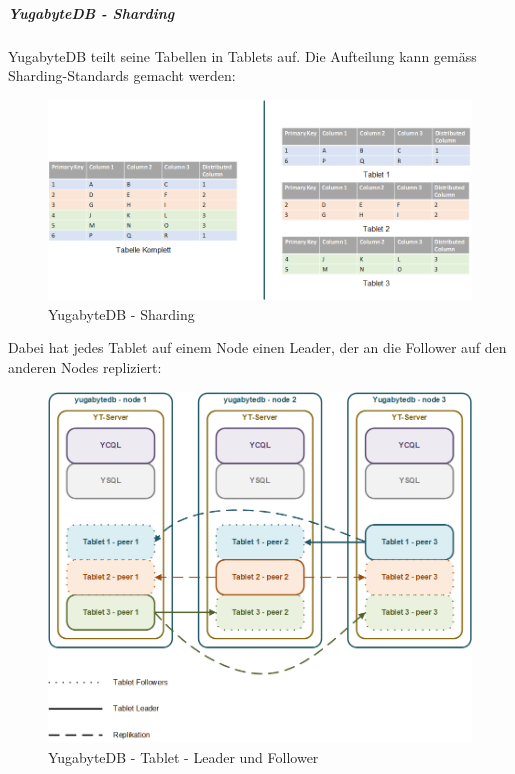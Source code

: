 \clearpage
\begin{flushleft}
    \subparagraph{YugabyteDB - Sharding}
    YugabyteDB teilt seine Tabellen in Tablets auf.
    Die Aufteilung kann gemäss Sharding-Standards gemacht werden:
    \begin{figure}[H]
        \centering
        \includegraphics[width=0.8\linewidth]{source/implementation/evaluation/postgresql_ha_solutions/yugabytedb/yugabytedb-sharding-tablets}
        \caption{YugabyteDB - Sharding}
        \label{fig:yugabytedb-sharding-tablets}
    \end{figure}
\end{flushleft}
\begin{flushleft}
    Dabei hat jedes Tablet auf einem Node einen Leader, der an die Follower auf den anderen Nodes repliziert:
    \begin{figure}[H]
        \centering
        \includegraphics[width=0.8\linewidth]{source/implementation/evaluation/postgresql_ha_solutions/yugabytedb/yugabytedb-tablet-masters}
        \caption{YugabyteDB - Tablet - Leader und Follower}
        \label{fig:yugabytedb-tablet-masters}
    \end{figure}
\end{flushleft}

